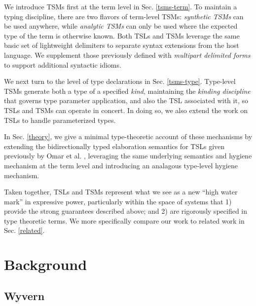 \documentclass{sig-alternate}
\begin{document}
We introduce TSMs first at the term level in Sec. \ref{tsms-term}.  To maintain a typing discipline, there are two flavors of term-level TSMs: \emph{synthetic TSMs} can be used anywhere, while \emph{analytic TSMs} can only be used where the expected type of the term is otherwise known. Both TSLs and TSMs leverage the same basic set of  lightweight delimiters to separate syntax extensions from the host language. We supplement those previously defined with \emph{multipart delimited forms} to support additional syntactic idioms.

We next turn to the level of type declarations  in Sec. \ref{tsms-type}. Type-level TSMs generate both a type of a specified \emph{kind}, maintaining the \emph{kinding discipline} that governs type parameter application, and also the TSL associated with it, so TSLs and TSMs can operate in concert. In doing so, we also extend the work on TSLs to handle parameterized types. %

In Sec. \ref{theory}, we give a minimal type-theoretic account of these mechanisms by extending the bidirectionally typed elaboration semantics for TSLs given previously by Omar et al. \cite{TSLs}, leveraging the same underlying semantics and hygiene mechanism at the term level and introducing an analagous type-level hygiene mechanism.%

Taken together, TSLs and TSMs represent what we see as a new ``high water mark'' in expressive power, particularly within the space of systems that 1) provide the strong  guarantees described above; and 2) are rigorously specified in type theoretic terms. We more specifically compare our work to related work in Sec. \ref{related}. 

\section{Background}\label{background}
\subsection{Wyvern}
\end{document}
